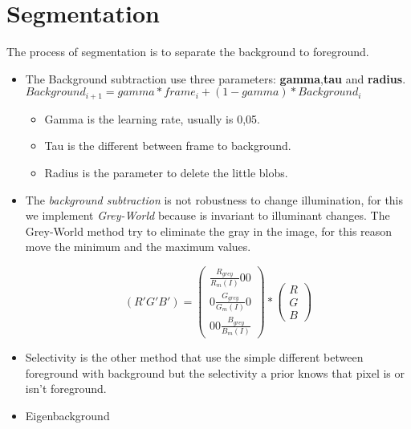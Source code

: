 \section{Segmentation}
The process of segmentation is to separate the background to foreground.

\begin{itemize}
\item The Background subtraction use three parameters: \textbf{gamma},\textbf{tau} and \textbf{radius}.
	$ Background_{i+1} = gamma*frame_{i} + (1-gamma)*Background_{i}$
	\begin{itemize}
	\item Gamma is the learning rate, usually is 0,05.
	\item Tau is the different between frame to background.
	\item Radius is the parameter to delete the little blobs.
	\end{itemize}
	
\item The \textit{background subtraction} is not robustness to change illumination, for this we implement \textit{Grey-World} because is invariant to illuminant changes. 
The Grey-World method try to eliminate the gray in the image, for this reason move the minimum and the maximum values.

\begin{equation}
	( R' G' B' )= \left(
	\begin{array}{ccc}
		\frac{R_{grey}}{R_{m}(I)}  0  0 \\
		0  \frac{G_{grey}}{G_{m}(I)}  0 \\
 		0  0  \frac{B_{grey}}{B_{m}(I)}
	\end{array}
	\right) 
	* 
	\left(
	\begin{array}{c} R \\ G \\ B
	\end{array}
	\right)
\end{equation} 

\item Selectivity is the other method that use the simple different between foreground with background but the selectivity a prior knows that pixel is or isn't foreground. 

\item Eigenbackground
\end{itemize}
 